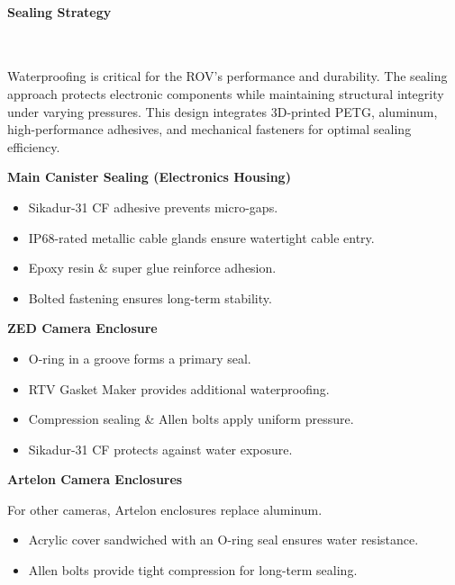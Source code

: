\vspace{-0.3cm}
\paragraph{Sealing Strategy} \ \\
\vspace{-0.5cm}

Waterproofing is critical for the ROV’s performance and durability. The sealing approach protects electronic components while maintaining structural integrity under varying pressures. This design integrates 3D-printed PETG, aluminum, high-performance adhesives, and mechanical fasteners for optimal sealing efficiency.

\vspace{0.2cm}
\textbf{Main Canister Sealing (Electronics Housing)}

\vspace{-0.5\baselineskip}
\begin{itemize}
    \setlength{\itemsep}{0pt}
    \item Sikadur-31 CF adhesive prevents micro-gaps.
    \item IP68-rated metallic cable glands ensure watertight cable entry.
    \item Epoxy resin \& super glue reinforce adhesion.
    \item Bolted fastening ensures long-term stability.
\end{itemize}

\break

\textbf{ZED Camera Enclosure}

\vspace{-0.7\baselineskip}
\begin{itemize}
    \setlength{\itemsep}{0pt}
    \item O-ring in a groove forms a primary seal.
    \item RTV Gasket Maker provides additional waterproofing.
    \item Compression sealing \& Allen bolts apply uniform pressure.
    \item Sikadur-31 CF protects against water exposure.
    
\end{itemize}

\textbf{Artelon Camera Enclosures}

For other cameras, Artelon enclosures replace aluminum.

\vspace{-0.7\baselineskip}
\begin{itemize}
    \setlength{\itemsep}{0pt}
    \item Acrylic cover sandwiched with an O-ring seal ensures water resistance.
    \item Allen bolts provide tight compression for long-term sealing.
\end{itemize}

